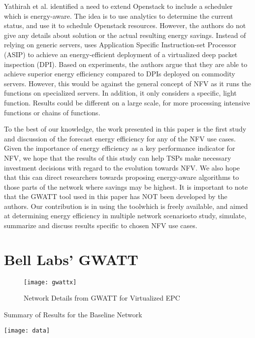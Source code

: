 \documentclass[conference]{IEEEtran}
\begin{document}
Yathirah et al. \cite{Yathiraj} identified a need to extend Openstack to include a scheduler which is energy-aware. The idea is to use analytics to determine the current status, and use it to schedule Openstack resources. However, the authors do not give any details about solution or the actual resulting energy savings. Instead of relying on generic servers, \cite{Koji14} uses Application Specific Instruction-set Processor (ASIP) to achieve an energy-efficient deployment of a virtualized deep packet inspection (DPI). Based on experiments, the authors argue that they are able to achieve superior energy efficiency compared to DPIs deployed on commodity servers. However, this would be against the general concept of NFV as it runs the functions on specialized servers. In addition, it only considers a specific, light function. Results could be different on a large scale, for more processing intensive functions or chains of functions.

\indent To the best of our knowledge, the work presented in this paper is the first study and discussion of the forecast energy efficiency for any of the NFV use cases. Given the importance of energy efficiency as a key performance indicator for NFV, we hope that the results of this study can help \acp{TSP} make necessary investment decisions with regard to the evolution towards \ac{NFV}. We also hope that this can direct researchers towards proposing energy-aware algorithms to those parts of the network where savings may be highest. It is important to note that the GWATT tool used in this paper has NOT been developed by the authors. Our contribution is in using the toolwhich is freely available, and aimed at determining energy efficiency in multiple network scenariosto study, simulate, summarize and discuss results specific to chosen NFV use cases.

\section{Bell Labs' GWATT}\label{tool}
 \begin{figure*}[t]
\begin{minipage}{.99\textwidth}
\centering
\resizebox{1.02\textwidth}{!}
{\texttt{[image: gwattx]}}
  \caption{Network Details from GWATT for Virtualized EPC}
  \label{tool1}
\end{minipage}
\end{figure*}
 \begin{table*}[!htbp]
\caption{Summary of Results for the Baseline Network}
\label{data}
\centering
\texttt{[image: data]}
\end{table*}
\end{document}
